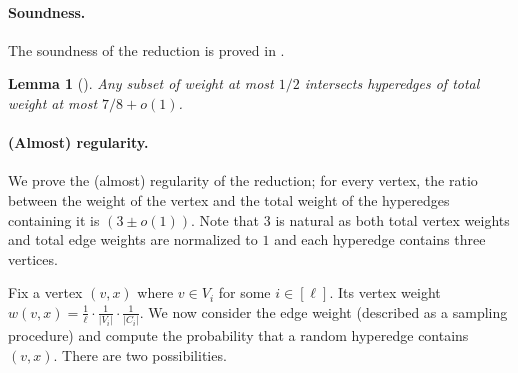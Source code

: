 \documentclass[10pt,a4paper]{amsart}
\newtheorem{lemma}[theorem]{Lemma}
\begin{document}
\paragraph{Soundness.} The soundness of the reduction is proved in \cite{Cohen-AddadSL22}.
\begin{lemma}[\cite{Cohen-AddadSL22}] Any subset of weight at most $1/2$ intersects hyperedges of total weight at most $7/8 + o(1)$.     
\end{lemma}

\paragraph{(Almost) regularity.}
We prove the (almost) regularity of the reduction; for every vertex, the ratio between the weight of the vertex and the total weight of the hyperedges containing it is $(3 \pm o(1))$. Note that $3$ is natural as both total vertex weights and total edge weights are normalized to $1$ and each hyperedge contains three vertices. 

Fix a vertex $(v, x)$ where $v \in V_i$ for some $i \in [\ell]$. Its vertex weight $w(v, x) = \frac{1}{\ell} \cdot \frac{1}{|V_i|} \cdot \frac{1}{|C_i|}$. 
We now consider the edge weight (described as a sampling procedure) and compute the probability that a random hyperedge contains $(v, x)$. There are two possibilities. 
\end{document}
